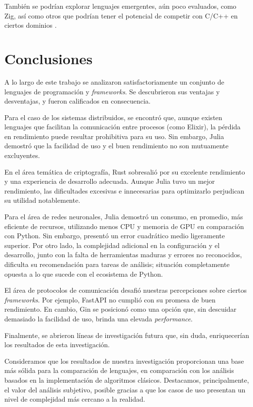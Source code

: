 \documentclass[11pt]{article}
\let\Oldsection\section
\renewcommand{\section}{\FloatBarrier\Oldsection}
\newcommand{\english}[1]{\textit{#1}}
\begin{document}
También se podrían explorar lenguajes emergentes, aún poco evaluados, como Zig, así como otros que podrían tener el potencial de competir con C/C++ en ciertos dominios \cite{cpp_killers}.

\newpage

\section{Conclusiones}

A lo largo de este trabajo se analizaron satisfactoriamente un conjunto de lenguajes de programación y \textit{frameworks}. Se descubrieron sus ventajas y desventajas, y fueron calificados en consecuencia.

Para el caso de los sistemas distribuidos, se encontró que, aunque existen lenguajes que facilitan la comunicación entre procesos (como Elixir), la pérdida en rendimiento puede resultar prohibitiva para su uso. Sin embargo, Julia demostró que la facilidad de uso y el buen rendimiento no son mutuamente excluyentes.

En el área temática de criptografía, Rust sobresalió por su excelente rendimiento y una experiencia de desarrollo adecuada. Aunque Julia tuvo un mejor rendimiento, las dificultades excesivas e innecesarias para optimizarlo perjudican su utilidad notablemente.

Para el área de redes neuronales, Julia demostró un consumo, en promedio, más eficiente de recursos, utilizando menos CPU y memoria de GPU en comparación con Python. Sin embargo, presentó un error cuadrático medio ligeramente superior. Por otro lado, la complejidad adicional en la configuración y el desarrollo, junto con la falta de herramientas maduras y errores no reconocidos, dificulta su recomendación para tareas de análisis; situación completamente opuesta a lo que sucede con el ecosistema de Python.

El área de protocolos de comunicación desafió nuestras percepciones sobre ciertos \textit{frameworks}. Por ejemplo, FastAPI no cumplió con su promesa de buen rendimiento. En cambio, Gin se posicionó como una opción que, sin descuidar demasiado la facilidad de uso, brinda una elevada \english{performance}.

Finalmente, se abrieron líneas de investigación futura que, sin duda, enriquecerían los resultados de esta investigación.

Consideramos que los resultados de nuestra investigación proporcionan una base más sólida para la comparación de lenguajes, en comparación con los análisis basados en la implementación de algoritmos clásicos. Destacamos, principalmente, el valor del análisis subjetivo, posible gracias a que los casos de uso presentan un nivel de complejidad más cercano a la realidad.
\end{document}
